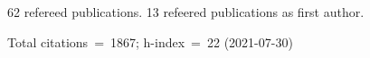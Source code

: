 62 refereed publications. 13 refeered publications as first author.

Total citations~=~1867; h-index~=~22 (2021-07-30)